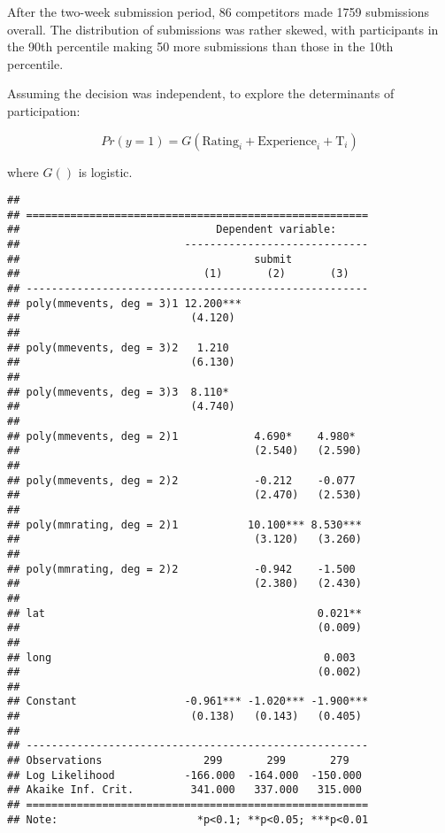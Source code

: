 \documentclass[12pt,]{article}
\begin{document}
After the two-week submission period, 86 competitors made 1759
submissions overall. The distribution of submissions was rather skewed,
with participants in the 90th percentile making 50 more submissions than
those in the 10th percentile.

Assuming the decision was independent, to explore the determinants of
participation:

\begin{equation}
  Pr(y=1) = G(\text{Rating}_{i} + \text{Experience}_{i} + \text{T}_{i})
\end{equation}

where \(G()\) is logistic.

\begin{verbatim}
## 
## ======================================================
##                               Dependent variable:     
##                          -----------------------------
##                                     submit            
##                             (1)       (2)       (3)   
## ------------------------------------------------------
## poly(mmevents, deg = 3)1 12.200***                    
##                           (4.120)                     
##                                                       
## poly(mmevents, deg = 3)2   1.210                      
##                           (6.130)                     
##                                                       
## poly(mmevents, deg = 3)3  8.110*                      
##                           (4.740)                     
##                                                       
## poly(mmevents, deg = 2)1            4.690*    4.980*  
##                                     (2.540)   (2.590) 
##                                                       
## poly(mmevents, deg = 2)2            -0.212    -0.077  
##                                     (2.470)   (2.530) 
##                                                       
## poly(mmrating, deg = 2)1           10.100*** 8.530*** 
##                                     (3.120)   (3.260) 
##                                                       
## poly(mmrating, deg = 2)2            -0.942    -1.500  
##                                     (2.380)   (2.430) 
##                                                       
## lat                                           0.021** 
##                                               (0.009) 
##                                                       
## long                                           0.003  
##                                               (0.002) 
##                                                       
## Constant                 -0.961*** -1.020*** -1.900***
##                           (0.138)   (0.143)   (0.405) 
##                                                       
## ------------------------------------------------------
## Observations                299       299       279   
## Log Likelihood           -166.000  -164.000  -150.000 
## Akaike Inf. Crit.         341.000   337.000   315.000 
## ======================================================
## Note:                      *p<0.1; **p<0.05; ***p<0.01
\end{verbatim}
\end{document}
